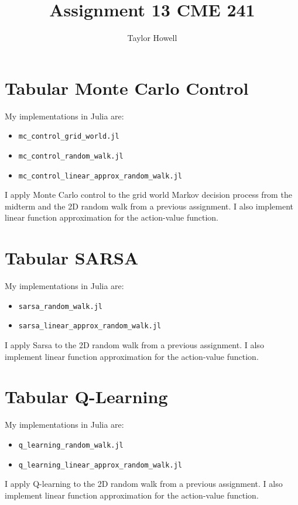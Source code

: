 \documentclass[12pt]{article}
\title{\textbf{Assignment 13 CME 241}}
\author{Taylor Howell}
\begin{document}
\maketitle

\newpage
\section{Tabular Monte Carlo Control}
My implementations in Julia are:
\begin{itemize}
\item \texttt{mc\_control\_grid\_world.jl} 
\item \texttt{mc\_control\_random\_walk.jl}
\item \texttt{mc\_control\_linear\_approx\_random\_walk.jl}
\end{itemize}

I apply Monte Carlo control to the grid world Markov decision process from the midterm and the 2D random walk from a previous assignment. I also implement linear function approximation for the action-value function.

\section{Tabular SARSA}
My implementations in Julia are:
\begin{itemize}

	\item \texttt{sarsa\_random\_walk.jl}
	\item \texttt{sarsa\_linear\_approx\_random\_walk.jl}
\end{itemize}

I apply Sarsa to the 2D random walk from a previous assignment. I also implement linear function approximation for the action-value function.

\section{Tabular Q-Learning}
My implementations in Julia are:
\begin{itemize}
	\item \texttt{q\_learning\_random\_walk.jl}
	\item \texttt{q\_learning\_linear\_approx\_random\_walk.jl}
\end{itemize}

I apply Q-learning to the 2D random walk from a previous assignment. I also implement linear function approximation for the action-value function.
\end{document}
